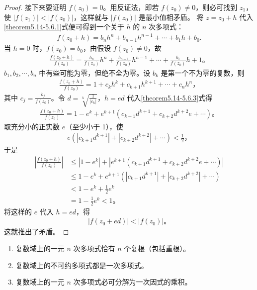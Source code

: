 \documentclass[../../main.tex]{subfiles}%
\begin{document}
\begin{proof}
接下来要证明 $f(z_0) = 0$。用反证法，即若 $f(z_0) \neq 0$，则必可找到 $z_1$，使
$|f(z_1)| < |f(z_0)|$，这样就与 $|f(z_0)|$ 是最小值相矛盾。
将 $z = z_0 + h$ 代入 \eqref{theorem5.14-5.6.1}式便可得到一个关于 $h$ 的 $n$ 次多项式：
\begin{align}
f(z_0 + h) = b_n h^n + b_{n-1} h^{n-1} + \cdots + b_1 h + b_0. \label{theorem5.14-5.6.2}
\end{align}
当 $h = 0$ 时，$f(z_0) = b_0$，由假设 $f(z_0) \neq 0$，故
\begin{align*}
\frac{f(z_0 + h)}{f(z_0)} = \frac{b_n}{f(z_0)} h^n + \frac{b_{n-1}}{f(z_0)} h^{n-1} + \cdots + \frac{b_1}{f(z_0)} h + 1。
\end{align*}
$b_1, b_2, \cdots, b_n$ 中有些可能为零，但绝不全为零。设 $b_k$ 是第一个不为零的复数，则
\begin{align}
\frac{f(z_0 + h)}{f(z_0)} = 1 + c_k h^k + c_{k+1} h^{k+1} + \cdots + c_n h^n， \label{theorem5.14-5.6.3}
\end{align}
其中 $c_j = \frac{b_j}{f(z_0)}$。令 $d = \sqrt[k]{\frac{1}{|c_k|}}$，$h = ed$ 代入\eqref{theorem5.14-5.6.3}式得
\begin{align*}
\frac{f(z_0 + h)}{f(z_0)} = 1 - e^k + e^{k+1} (c_{k+1} d^{k+1} + c_{k+2} d^{k+2} e + \cdots)。
\end{align*}
取充分小的正实数 $e$（至少小于 1），使
\begin{align*}
e (|c_{k+1} d^{k+1}| + |c_{k+2} d^{k+2}| + \cdots) < \frac{1}{2}，
\end{align*}
于是
\begin{align*}
\left| \frac{f(z_0 + h)}{f(z_0)} \right| &\leqslant  |1 - e^k| + |e^{k+1} (c_{k+1} d^{k+1} + c_{k+2} d^{k+2} e + \cdots)| \\
&\leqslant  1 - e^k + e^{k+1} (|c_{k+1} d^{k+1}| + |c_{k+2} d^{k+2}| + \cdots) \\
&< 1 - e^k + \frac{1}{2} e^k \\
&= 1 - \frac{1}{2} e^k < 1。
\end{align*}
将这样的 $e$ 代入 $h = ed$，得
\begin{align*}
|f(z_0 + ed)| < |f(z_0)|。
\end{align*}
这就推出了矛盾。
\end{proof}

\begin{corollary}
\begin{enumerate}
\item 复数域上的一元 $n$ 次多项式恰有 $n$ 个复根（包括重根）。

\item 复数域上的不可约多项式都是一次多项式。

\item 复数域上的一元 $n$ 次多项式必可分解为一次因式的乘积。
\end{enumerate}
\end{corollary}
\end{document}
